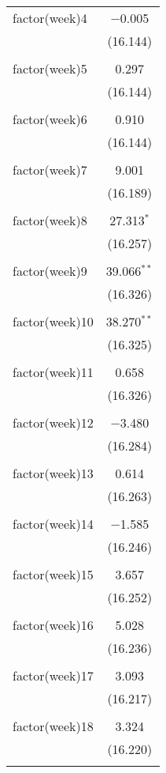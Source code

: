 \documentclass{article}
\begin{document}
\begin{table}[!htbp]
\begin{tabular}{@{\extracolsep{5pt}}lc}
 factor(week)4 & $-$0.005 \\ 
  & (16.144) \\ 
  & \\ 
 factor(week)5 & 0.297 \\ 
  & (16.144) \\ 
  & \\ 
 factor(week)6 & 0.910 \\ 
  & (16.144) \\ 
  & \\ 
 factor(week)7 & 9.001 \\ 
  & (16.189) \\ 
  & \\ 
 factor(week)8 & 27.313$^{*}$ \\ 
  & (16.257) \\ 
  & \\ 
 factor(week)9 & 39.066$^{**}$ \\ 
  & (16.326) \\ 
  & \\ 
 factor(week)10 & 38.270$^{**}$ \\ 
  & (16.325) \\ 
  & \\ 
 factor(week)11 & 0.658 \\ 
  & (16.326) \\ 
  & \\ 
 factor(week)12 & $-$3.480 \\ 
  & (16.284) \\ 
  & \\ 
 factor(week)13 & 0.614 \\ 
  & (16.263) \\ 
  & \\ 
 factor(week)14 & $-$1.585 \\ 
  & (16.246) \\ 
  & \\ 
 factor(week)15 & 3.657 \\ 
  & (16.252) \\ 
  & \\ 
 factor(week)16 & 5.028 \\ 
  & (16.236) \\ 
  & \\ 
 factor(week)17 & 3.093 \\ 
  & (16.217) \\ 
  & \\ 
 factor(week)18 & 3.324 \\ 
  & (16.220) \\ 
  & \\ 

\end{tabular}
\end{table}
\end{document}
